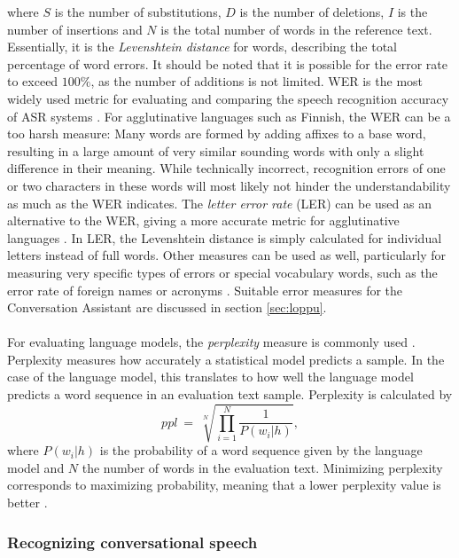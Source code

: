 \documentclass[english, 12pt, a4paper, pdftex, elec, utf8]{aaltothesis}
\begin{document}
where $S$ is the number of substitutions, $D$ is the number of deletions, $I$ is the number of insertions and $N$ is the total number of words in the reference text. Essentially, it is the \textit{Levenshtein distance} for words, describing the total percentage of word errors. It should be noted that it is possible for the error rate to exceed $100\%$, as the number of additions is not limited. WER is the most widely used metric for evaluating and comparing the speech recognition accuracy of ASR systems \cite{huang2001spoken, kallasjoki2016}. For agglutinative languages such as Finnish, the WER can be a too harsh measure: Many words are formed by adding affixes to a base word, resulting in a large amount of very similar sounding words with only a slight difference in their meaning. While technically incorrect, recognition errors of one or two characters in these words will most likely not hinder the understandability as much as the WER indicates. The \textit{letter error rate} (LER) can be used as an alternative to the WER, giving a more accurate metric for agglutinative languages \cite[p.~41--42]{kallasjoki2016}. In LER, the Levenshtein distance is simply calculated for individual letters instead of full words. Other measures can be used as well, particularly for measuring very specific types of errors or special vocabulary words, such as the error rate of foreign names or acronyms \cite{mansikkaniemi2017continuous}. Suitable error measures for the Conversation Assistant are discussed in section \ref{sec:loppu}. \\\\
For evaluating language models, the \textit{perplexity} measure is commonly used \cite{mansikkaniemi2017continuous}. Perplexity measures how accurately a statistical model predicts a sample. In the case of the language model, this translates to how well the language model predicts a word sequence in an evaluation text sample. Perplexity is calculated by
\begin{equation}
ppl \ = \ \sqrt[N]{\prod_{i=1}^{N} \frac{1}{P(w_i|h)}},
\end{equation}
where $P(w_i|h)$ is the probability of a word sequence given by the language model and $N$ the number of words in the evaluation text. Minimizing perplexity corresponds to maximizing probability, meaning that a lower perplexity value is better \cite{mansikkaniemi2017continuous}.

\subsubsection{Recognizing conversational speech} \label{sec:lvcsr}
\end{document}
